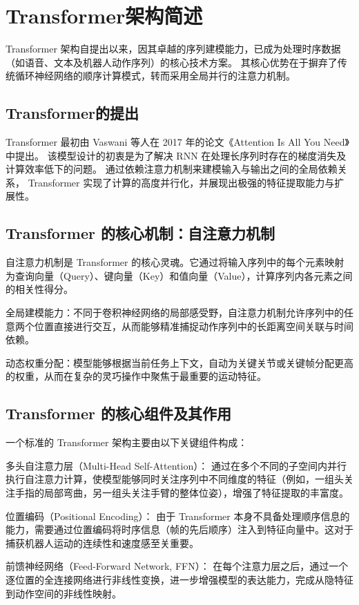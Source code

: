 \section{Transformer架构简述}
Transformer 架构自提出以来，因其卓越的序列建模能力，已成为处理时序数据（如语音、文本及机器人动作序列）的核心技术方案。
其核心优势在于摒弃了传统循环神经网络的顺序计算模式，转而采用全局并行的注意力机制。
\subsection{Transformer的提出}
Transformer 最初由 Vaswani 等人在 2017 年的论文《Attention Is All You Need》中提出\cite{vaswaniAttentionAllYou2017}。
该模型设计的初衷是为了解决 RNN 在处理长序列时存在的梯度消失及计算效率低下的问题。
通过依赖注意力机制来建模输入与输出之间的全局依赖关系，
Transformer 实现了计算的高度并行化，并展现出极强的特征提取能力与扩展性。
\subsection{Transformer 的核心机制：自注意力机制}
自注意力机制是 Transformer 的核心灵魂。它通过将输入序列中的每个元素映射为查询向量（Query）、键向量（Key）和值向量（Value），计算序列内各元素之间的相关性得分。

全局建模能力：不同于卷积神经网络的局部感受野，自注意力机制允许序列中的任意两个位置直接进行交互，从而能够精准捕捉动作序列中的长距离空间关联与时间依赖。

动态权重分配：模型能够根据当前任务上下文，自动为关键关节或关键帧分配更高的权重，从而在复杂的灵巧操作中聚焦于最重要的运动特征。
\subsection{Transformer 的核心组件及其作用}
一个标准的 Transformer 架构主要由以下关键组件构成：

多头自注意力层（Multi-Head Self-Attention）：
通过在多个不同的子空间内并行执行自注意力计算，使模型能够同时关注序列中不同维度的特征（例如，一组头关注手指的局部弯曲，另一组头关注手臂的整体位姿），增强了特征提取的丰富度。

位置编码（Positional Encoding）：
由于 Transformer 本身不具备处理顺序信息的能力，需要通过位置编码将时序信息（帧的先后顺序）注入到特征向量中。这对于捕获机器人运动的连续性和速度感至关重要。

前馈神经网络（Feed-Forward Network, FFN）：
在每个注意力层之后，通过一个逐位置的全连接网络进行非线性变换，进一步增强模型的表达能力，完成从隐特征到动作空间的非线性映射。

